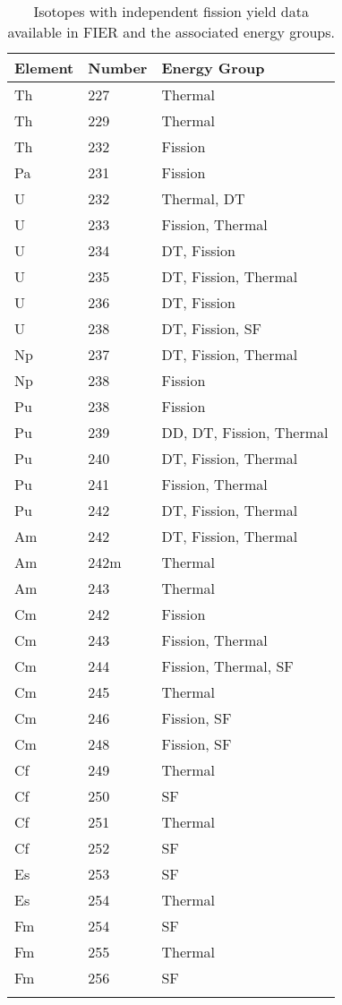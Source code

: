 \documentclass{article}
\begin{document}
\begin{appendices}
\begin{longtable}{p{}p{} p{}}


\hline
Element&Number&Energy Group\\
\hline
    

    \endhead
    
     
Th&227&Thermal\\
Th&229&Thermal\\
Th&232&Fission\\
Pa&231&Fission\\
U&232&Thermal, DT \\
U&233&Fission, Thermal\\
U&234&DT, Fission\\
U&235&DT, Fission, Thermal\\
U&236&DT, Fission\\
U&238&DT, Fission, SF\\
Np&237&DT, Fission, Thermal\\
Np&238&Fission\\
Pu&238&Fission\\
Pu&239&DD, DT, Fission, Thermal\\
Pu&240&DT, Fission, Thermal\\
Pu&241&Fission, Thermal\\
Pu&242&DT, Fission, Thermal\\
Am&242&DT, Fission, Thermal\\
Am&242m&Thermal\\
Am&243&Thermal\\
Cm&242&Fission\\
Cm&243&Fission, Thermal\\
Cm&244&Fission, Thermal, SF\\
Cm&245&Thermal\\
Cm&246&Fission, SF\\
Cm&248&Fission, SF\\
Cf&249&Thermal\\
Cf&250&SF\\
Cf&251&Thermal\\
Cf&252&SF\\
Es&253&SF\\
Es&254&Thermal\\
Fm&254&SF\\
Fm&255&Thermal\\
Fm&256&SF\\
\hline
\caption{Isotopes with independent fission yield data \cite{SIGMA} available in FIER and the associated energy groups.}
\label{tab:2.1}
\end{longtable}
\pagebreak


\end{appendices}
\end{document}
